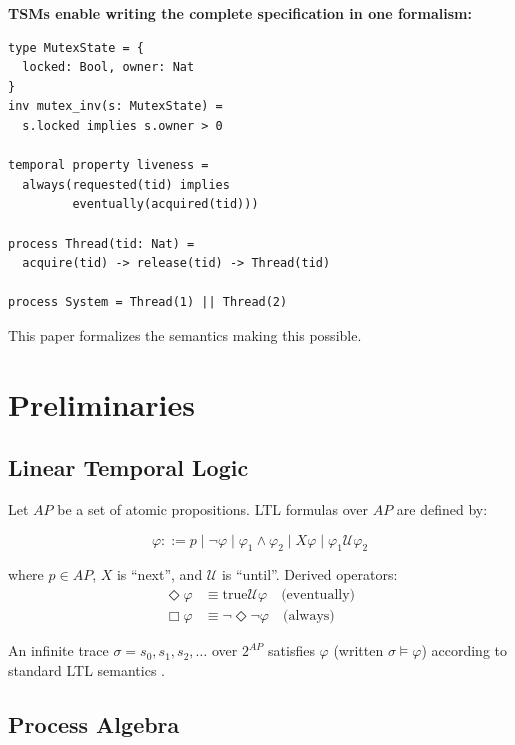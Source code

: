 \documentclass[conference]{IEEEtran}
\begin{document}
\textbf{TSMs enable writing the complete specification in one formalism:}

\begin{lstlisting}[caption={TSM (unified specification)}]
type MutexState = {
  locked: Bool, owner: Nat
}
inv mutex_inv(s: MutexState) =
  s.locked implies s.owner > 0

temporal property liveness =
  always(requested(tid) implies
         eventually(acquired(tid)))

process Thread(tid: Nat) =
  acquire(tid) -> release(tid) -> Thread(tid)

process System = Thread(1) || Thread(2)
\end{lstlisting}

This paper formalizes the semantics making this possible.

\section{Preliminaries}

\subsection{Linear Temporal Logic}

Let $AP$ be a set of atomic propositions. LTL formulas over $AP$ are defined by:

\begin{equation}
\varphi ::= p \mid \neg\varphi \mid \varphi_1 \wedge \varphi_2 \mid X\varphi \mid \varphi_1 \mathbin{\mathcal{U}} \varphi_2
\end{equation}

where $p \in AP$, $X$ is ``next'', and $\mathbin{\mathcal{U}}$ is ``until''. Derived operators:
\begin{align}
\Diamond\varphi &\equiv \text{true} \mathbin{\mathcal{U}} \varphi \quad \text{(eventually)} \\
\Box\varphi &\equiv \neg\Diamond\neg\varphi \quad \text{(always)}
\end{align}

An infinite trace $\sigma = s_0, s_1, s_2, \ldots$ over $2^{AP}$ satisfies $\varphi$ (written $\sigma \models \varphi$) according to standard LTL semantics \cite{pnueli1977}.

\subsection{Process Algebra}
\end{document}
